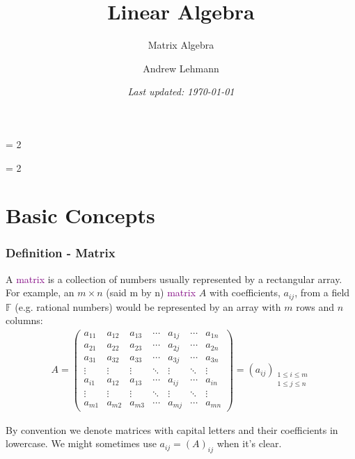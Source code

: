 \documentclass[usenames,dvipsnames,aspectratio=169,10pt]{beamer}
\def \SCHOOLVERSION {2} %
\numberwithin{equation}{section}
\begin{document}
\title{Linear Algebra}
\subtitle{Matrix Algebra}
\author{Andrew Lehmann}
\ifnum \SCHOOLVERSION = 2
\fi
\date{\textit{Last updated: \today}}

\ifnum \SCHOOLVERSION = 2
\fi


\begin{frame}
\titlepage
\end{frame}


\section{Basic Concepts}



\begin{frame}
\frametitle{Definition - Matrix}

A \textcolor{Purple}{matrix} is a collection of numbers usually represented by a rectangular array. For example, an $m \times n$ (said m by n) \textcolor{Purple}{matrix} $A$ with coefficients, $a_{ij}$, from a field $\mathbb{F}$ (e.g. rational numbers) would be represented by an array with $m$ rows and $n$ columns:
\begin{align*}
A =
\begin{pmatrix}
a_{11} & a_{12} & a_{13} & \cdots & a_{1j} & \cdots & a_{1n} \\
a_{21} & a_{22} & a_{23} & \cdots & a_{2j} & \cdots & a_{2n} \\
a_{31} & a_{32} & a_{33} & \cdots & a_{3j} & \cdots & a_{3n} \\
\vdots & \vdots & \vdots & \ddots & \vdots & \ddots & \vdots \\
a_{i1} & a_{12} & a_{13} & \cdots & a_{ij} & \cdots & a_{in} \\
\vdots & \vdots & \vdots & \ddots & \vdots & \ddots & \vdots \\
a_{m1} & a_{m2} & a_{m3} & \cdots & a_{mj} & \cdots & a_{mn}
\end{pmatrix}
=
\left( a_{ij} \right)_{\substack{ 1 \leq i \leq m \\ 1 \leq j \leq n }}
\end{align*}

By convention we denote matrices with capital letters and their coefficients in lowercase. We might sometimes use $a_{ij}=\left(A\right)_{ij}$ when it's clear.
\end{frame}
\end{document}
